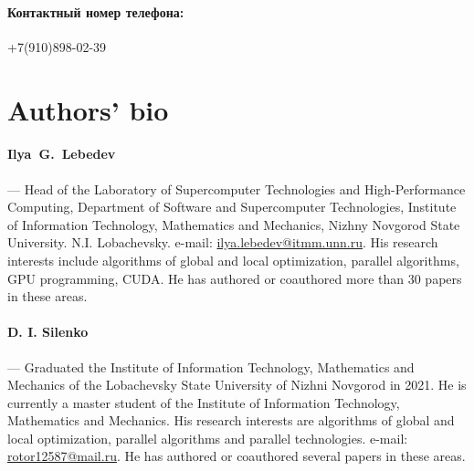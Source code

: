 \documentclass[12pt, a4paper, russian]{article}
\begin{document}
\paragraph{Контактный номер телефона:}{+7(910)898-02-39}

\section*{Authors' bio}

\paragraph{Ilya~G.~Lebedev} --- Head of the Laboratory of Supercomputer Technologies and High-Performance Computing, Department of Software and Supercomputer Technologies, Institute of Information Technology, Mathematics and Mechanics, Nizhny Novgorod State University. N.I. Lobachevsky. e-mail: \url{ilya.lebedev@itmm.unn.ru}. His research interests include algorithms of global and local optimization, parallel algorithms, GPU programming, CUDA. He has authored or coauthored more than 30 papers in these areas.

\paragraph{D. I. Silenko} --- Graduated the Institute of Information Technology, Mathematics and Mechanics of the Lobachevsky State University of Nizhni Novgorod in 2021. He is currently a master student of the Institute of Information Technology, Mathematics and Mechanics. His research interests are algorithms of global and local optimization, parallel algorithms and parallel technologies. e-mail: \url{rotor12587@mail.ru}. He has authored or coauthored several papers in these areas.
\end{document}
